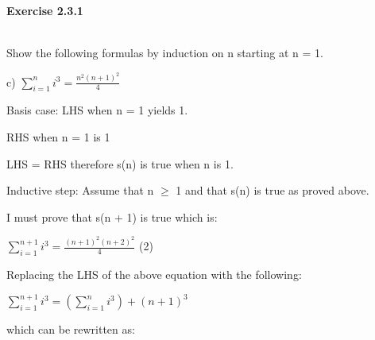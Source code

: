 \documentclass[12pt]{article}
\begin{document}
\begin{title}
    \centering
    {\LARGE\bfseries Exercise 2.3.1}
\end{title}\\

\vspace{10mm} %
Show the following formulas by induction on n starting at n = 1.

\vspace{5mm} %

c) $\sum_{i=1}^{n}i^3 = \frac{n^2(n+1)^2}{4}$\par

\vspace{5mm} %

Basis case: LHS when n = 1 yields 1.\par

\vspace{5mm} %

RHS when n = 1 is 1\par

LHS = RHS therefore s(n) is true when n is 1.\par

Inductive step: Assume that n $\geq$ 1 and that s(n) is true as proved above.\par I must prove that s(n + 1) is true which is:\par

\vspace{5mm} %

$\sum_{i=1}^{n+1}i^3 = \frac{(n+1)^2(n+2)^2}{4}$   \hfil\hfil\hfil (2)\par

\vspace{5mm} %

Replacing the LHS of the above equation with the following:\par

\vspace{5mm} %

$\sum_{i=1}^{n+1}i^3 = (\sum_{i=1}^{n}i^3) + (n + 1)^3$\par

\vspace{5mm} %

which can be rewritten as:\par

\vspace{5mm} %
\end{document}
